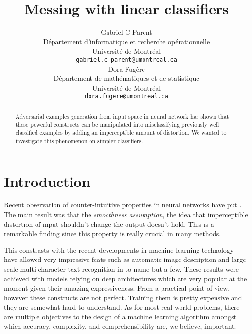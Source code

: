 \documentclass{article} %
\title{Messing with linear classifiers}
\author{
Gabriel C-Parent\\
Département d’informatique et recherche opérationnelle\\
Université de Montréal\\
\texttt{gabriel.c-parent@umontreal.ca} \\
\And
Dora Fugère \\
Département de mathématiques et de statistique \\
Université de Montréal\\
\texttt{dora.fugere@umontreal.ca} \\
}
\begin{document}
\maketitle

\begin{abstract}
Adversarial examples generation from input space in neural network
has shown that these powerful constructs can be manipulated into misclassifying
previously well classified examples by adding an imperceptible amount of
distortion. We wanted to investigate this phenomenon on simpler classifiers.
\end{abstract}


\section{Introduction}

Recent observation of counter-intuitive properties in
neural networks have put \citep{szegedy_intriguing_2013}. The main result was
that the \textit{smoothness assumption}, the idea that imperceptible distortion
of input shouldn't change the output doesn't hold. This is a remarkable finding
since this property is really crucial in many methods.

This constrasts with the recent developments in machine learning technology
have allowed very impressive feats such as automatic image description
\citep{vinyals_show_2014} and large-scale multi-character text recognition in
\citep{goodfellow_multi-digit_2013} to name but a few.
These results were achieved with models relying on deep architectures which are
very popular at the moment given their amazing expressiveness.
From a practical point of view, however these constructs are not perfect.
Training them is pretty expensive and they are somewhat hard to understand. As
for most real-world problems, there are multiple objectives to the design of a
machine learning algorithm amongst which accuracy, complexity, and
comprehensibility are, we believe, important.
\end{document}
